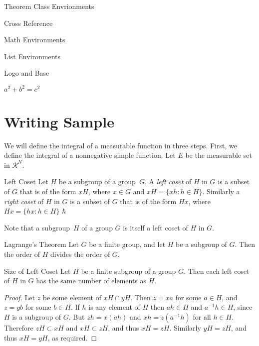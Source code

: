 \documentclass[11pt,fancy,authoryear]{elegantbook}
\begin{document}
\begin{introduction}
\item Theorem Class Envrionments
\item Cross Reference
\item Math Environments
\item List Environments
\item Logo and Base 
\item $a^2+b^2=c^2$
\end{introduction}


\lipsum[1]

\section{Writing Sample}

We will define the integral of a measurable function in three steps. First, we define the integral of a nonnegative simple function. Let $E$ be the measurable set in $\mathcal{R}^N$.

\begin{definition}{Left Coset}{}
Let $H$ be a subgroup of a group~$G$.  A \emph{left coset} of $H$ in $G$ is a subset of $G$ that is of the form $xH$, where $x \in G$ and $xH = \{ xh : h \in H \}$. Similarly a \emph{right coset} of $H$ in $G$ is a subset of $G$ that is of the form $Hx$, where $Hx = \{ hx : h \in H \}$ $\hbar$
\end{definition}

\begin{note}
Note that a subgroup~$H$ of a group $G$ is itself a left coset of $H$ in $G$.
\end{note}

\lipsum[2]

\begin{theorem}{Lagrange's Theorem}{}
Let $G$ be a finite group, and let $H$ be a subgroup of $G$.  Then the order of $H$ divides the order of $G$.
\end{theorem}

\lipsum[3]

   
\begin{proposition}{Size of Left Coset}{}
Let $H$ be a finite subgroup of a group $G$.  Then each left coset of $H$ in $G$ has the same number of elements as $H$.
\end{proposition}

\begin{proof}
Let $z$ be some element of $xH \cap yH$.  Then $z = xa$ for some $a \in H$, and $z = yb$ for some $b \in H$. If $h$ is any element of $H$ then $ah \in H$ and $a^{-1}h \in H$, since $H$ is a subgroup of $G$. But $zh = x(ah)$ and $xh = z(a^{-1}h)$ for all $h \in H$. Therefore $zH \subset xH$ and $xH \subset zH$, and thus $xH = zH$.  Similarly $yH = zH$, and thus $xH = yH$, as required. 
\end{proof}
\end{document}
